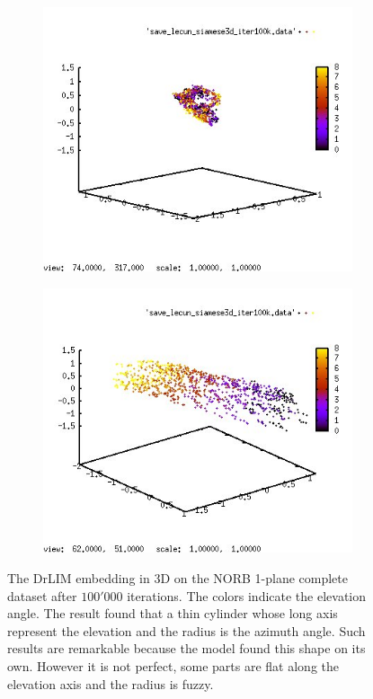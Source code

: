 \documentclass[a4paper,12pt]{report}
\begin{document}
\begin{figure}[h]
    \centering
    \begin{subfigure}{0.65\textwidth}
        \centering
        \includegraphics[width=\textwidth]{thesis_figures/norb_drlim1.jpg}
    \end{subfigure}
    \begin{subfigure}{0.65\textwidth}
        \centering
        \includegraphics[width=\textwidth]{thesis_figures/norb_drlim2.jpg}
    \end{subfigure}
    \caption{The DrLIM embedding in 3D on the NORB 1-plane complete dataset after $100'000$ iterations.
    The colors indicate the elevation angle.
    The result found that a thin cylinder whose long axis represent the elevation and the radius is the azimuth angle.
    Such results are remarkable because the model found this shape on its own.
    However it is not perfect, some parts are flat along the elevation axis and the radius is fuzzy.
    }
    \label{fig:norb_drlim_embedding}
\end{figure}
\end{document}
